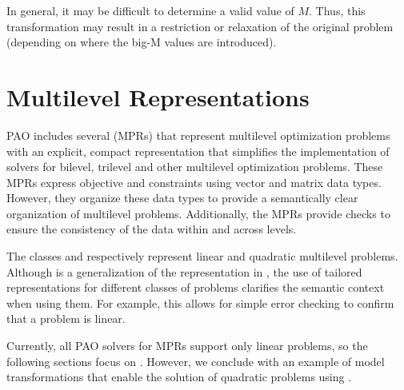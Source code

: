 \documentclass[letterpaper,10pt,english]{sphinxmanual}
\begin{document}
In general, it may be difficult to determine a valid value of $M$.   Thus, this transformation may
result in a restriction or relaxation of the original problem (depending on where the big-M values
are introduced).


\section{Multilevel Representations}
\label{\detokenize{representations/mpr:multilevel-representations}}\label{\detokenize{representations/mpr::doc}}
PAO includes several  (MPRs)
that represent multilevel optimization problems with an explicit,
compact representation that simplifies the implementation of solvers for
bilevel, trilevel and other multilevel optimization problems.  These MPRs
express objective and constraints using vector and matrix data types.
However, they organize these data types to provide a semantically clear
organization of multilevel problems.  Additionally, the MPRs provide
checks to ensure the consistency of the data within and across levels.

The classes {\hyperref[\detokenize{reference/mpr:pao.mpr.repn.LinearMultilevelProblem}]{}}
and {\hyperref[\detokenize{reference/mpr:pao.mpr.repn.QuadraticMultilevelProblem}]{}} respectively
represent linear and quadratic multilevel problems.  Although
{\hyperref[\detokenize{reference/mpr:pao.mpr.repn.QuadraticMultilevelProblem}]{}} is a generalization of the
representation in {\hyperref[\detokenize{reference/mpr:pao.mpr.repn.LinearMultilevelProblem}]{}}, the use of tailored
representations for different classes of problems clarifies the semantic
context when using them.  For example, this allows for simple error checking
to confirm that a problem is linear.

Currently, all PAO solvers for MPRs support only linear problems, so the
following sections focus on {\hyperref[\detokenize{reference/mpr:pao.mpr.repn.LinearMultilevelProblem}]{}}.  However,
we conclude with an example of model transformations that enable the
solution of quadratic problems using {\hyperref[\detokenize{reference/mpr:pao.mpr.repn.QuadraticMultilevelProblem}]{}}.
\end{document}
